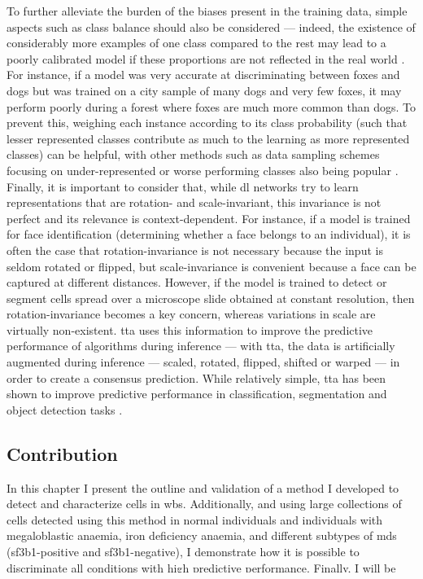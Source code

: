 To further alleviate the burden of the biases present in the training data, simple aspects such as class balance should also be considered --- indeed, the existence of considerably more examples of one class compared to the rest may lead to a poorly calibrated model if these proportions are not reflected in the real world \cite{Van_Calster2019-zp}. For instance, if a model was very accurate at discriminating between foxes and dogs but was trained on a city sample of many dogs and very few foxes, it may perform poorly during a forest where foxes are much more common than dogs. To prevent this, weighing each instance according to its class probability (such that lesser represented classes contribute as much to the learning as more represented classes) can be helpful, with other methods such as data sampling schemes focusing on under-represented or worse performing classes also being popular \cite{Johnson2019-cf}. Finally, it is important to consider that, while \ac{dl} networks try to learn representations that are rotation- and scale-invariant, this invariance is not perfect and its relevance is context-dependent. For instance, if a model is trained for face identification (determining whether a face belongs to an individual), it is often the case that rotation-invariance is not necessary because the input is seldom rotated or flipped, but scale-invariance is convenient because a face can be captured at different distances. However, if the model is trained to detect or segment cells spread over a microscope slide obtained at constant resolution, then rotation-invariance becomes a key concern, whereas variations in scale are virtually non-existent. \Ac{tta} uses this information to improve the predictive performance of algorithms during inference --- with \ac{tta}, the data is artificially augmented during inference --- scaled, rotated, flipped, shifted or warped --- in order to create a consensus prediction. While relatively simple, \ac{tta} has been shown to improve predictive performance in classification, segmentation and object detection tasks \cite{Moshkov2020-rc,Shorten2019-hr}.

\subsection{Contribution}

In this chapter I present the outline and validation of a method I developed to detect and characterize cells in \ac{wbs}. Additionally, and using large collections of cells detected using this method in normal individuals and individuals with megaloblastic anaemia, iron deficiency anaemia, and different subtypes of \ac{mds} (\ac{sf3b1}-positive and \ac{sf3b1}-negative), I demonstrate how it is possible to discriminate all conditions with high predictive performance. Finally, I will be presenting \ac{mile-vice}, a weakly-supervised \ac{ml} framework to cluster cells into virtual cell types which can be used to derive cellular archetypes that characterize specific conditions and enable the discovery of novel cytomorphological markers.

